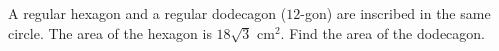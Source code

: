 A regular hexagon and a regular dodecagon ($12$-gon) are inscribed in the same circle. The area of the hexagon is $18\sqrt3$ cm$^2$. Find the area of the dodecagon.
